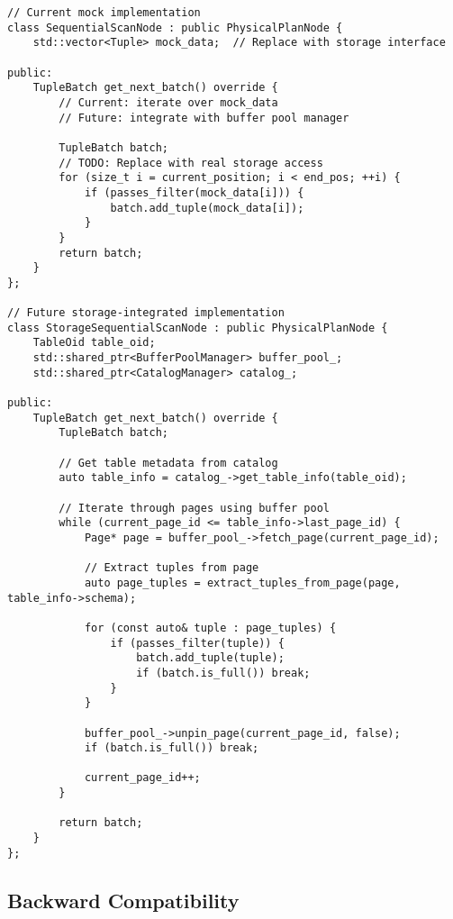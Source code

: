 \documentclass[12pt,a4paper]{article}
\begin{document}
\begin{lstlisting}[style=cpp, caption=Storage Interface Extension Point]
// Current mock implementation
class SequentialScanNode : public PhysicalPlanNode {
    std::vector<Tuple> mock_data;  // Replace with storage interface
    
public:
    TupleBatch get_next_batch() override {
        // Current: iterate over mock_data
        // Future: integrate with buffer pool manager
        
        TupleBatch batch;
        // TODO: Replace with real storage access
        for (size_t i = current_position; i < end_pos; ++i) {
            if (passes_filter(mock_data[i])) {
                batch.add_tuple(mock_data[i]);
            }
        }
        return batch;
    }
};

// Future storage-integrated implementation
class StorageSequentialScanNode : public PhysicalPlanNode {
    TableOid table_oid;
    std::shared_ptr<BufferPoolManager> buffer_pool_;
    std::shared_ptr<CatalogManager> catalog_;
    
public:
    TupleBatch get_next_batch() override {
        TupleBatch batch;
        
        // Get table metadata from catalog
        auto table_info = catalog_->get_table_info(table_oid);
        
        // Iterate through pages using buffer pool
        while (current_page_id <= table_info->last_page_id) {
            Page* page = buffer_pool_->fetch_page(current_page_id);
            
            // Extract tuples from page
            auto page_tuples = extract_tuples_from_page(page, table_info->schema);
            
            for (const auto& tuple : page_tuples) {
                if (passes_filter(tuple)) {
                    batch.add_tuple(tuple);
                    if (batch.is_full()) break;
                }
            }
            
            buffer_pool_->unpin_page(current_page_id, false);
            if (batch.is_full()) break;
            
            current_page_id++;
        }
        
        return batch;
    }
};
\end{lstlisting}

\subsection{Backward Compatibility}
\end{document}
